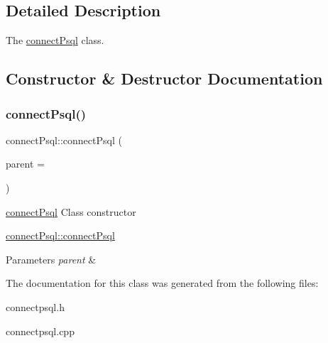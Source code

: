 \subsection{Detailed Description}
The \hyperlink{classconnect_psql}{connect\+Psql} class. 

\subsection{Constructor \& Destructor Documentation}
\mbox{\label{classconnect_psql_a15eb3b9795494a0e623d053136b1e617}} 
\subsubsection{\texorpdfstring{connect\+Psql()}{connectPsql()}}
{\footnotesize\ttfamily connect\+Psql\+::connect\+Psql (\begin{DoxyParamCaption}\item[{Q\+Widget $\ast$}]{parent = {} }\end{DoxyParamCaption})\hspace{0.3cm}{\ttfamily [explicit]}}



\hyperlink{classconnect_psql}{connect\+Psql} Class constructor 

\hyperlink{classconnect_psql_a15eb3b9795494a0e623d053136b1e617}{connect\+Psql\+::connect\+Psql}


\begin{DoxyParams}{Parameters}
{\em parent} & \\
\hline
\end{DoxyParams}


The documentation for this class was generated from the following files\+:\begin{DoxyCompactItemize}
\item 
connectpsql.\+h\item 
connectpsql.\+cpp\end{DoxyCompactItemize}
